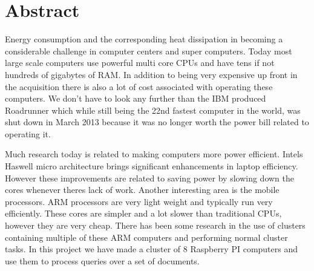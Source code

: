 \clearpage

\section{Abstract}
Energy consumption and the corresponding heat dissipation in becoming a considerable challenge in computer centers and super computers. Today most large scale computers use powerful multi core CPUs and have tens if not hundreds of gigabytes of RAM. In addition to being very expensive up front in the acquisition there is also a lot of cost associated with operating these computers. We don't have to look any further than the IBM produced Roadrunner which while still being the 22nd fastest computer in the world, was shut down in March 2013 because it was no longer worth the power bill related to operating it.\cite{roadrunner}

Much research today is related to making computers more power efficient. Intels Haswell micro architecture brings significant enhancements in laptop efficiency. However these improvements are related to saving power by slowing down the cores whenever theres lack of work. Another interesting area is the mobile processors. ARM processors are very light weight and typically run very efficiently. These cores are simpler and a lot slower than traditional CPUs, however they are very cheap. There has been some research in the use of clusters containing multiple of these ARM computers and performing normal cluster tasks. In this project we have made a cluster of 8 Raspberry PI computers and use them to process queries over a set of documents.
